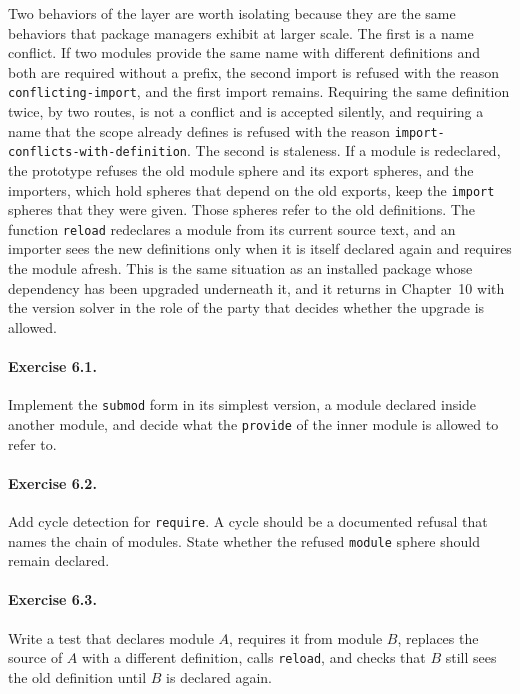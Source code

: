 \documentclass[11pt,oneside]{report}
\theoremstyle{plain}
\theoremstyle{definition}
\theoremstyle{remark}
\begin{document}
Two behaviors of the layer are worth isolating because they are the same behaviors that package managers exhibit at larger scale. The first is a name conflict. If two modules provide the same name with different definitions and both are required without a prefix, the second import is refused with the reason \texttt{conflicting-import}, and the first import remains. Requiring the same definition twice, by two routes, is not a conflict and is accepted silently, and requiring a name that the scope already defines is refused with the reason \texttt{import-conflicts-with-definition}. The second is staleness. If a module is redeclared, the prototype refuses the old module sphere and its export spheres, and the importers, which hold spheres that depend on the old exports, keep the \texttt{import} spheres that they were given. Those spheres refer to the old definitions. The function \texttt{reload} redeclares a module from its current source text, and an importer sees the new definitions only when it is itself declared again and requires the module afresh. This is the same situation as an installed package whose dependency has been upgraded underneath it, and it returns in Chapter~10 with the version solver in the role of the party that decides whether the upgrade is allowed.

\paragraph{Exercise 6.1.} Implement the \texttt{submod} form in its simplest version, a module declared inside another module, and decide what the \texttt{provide} of the inner module is allowed to refer to.

\paragraph{Exercise 6.2.} Add cycle detection for \texttt{require}. A cycle should be a documented refusal that names the chain of modules. State whether the refused \texttt{module} sphere should remain declared.

\paragraph{Exercise 6.3.} Write a test that declares module $A$, requires it from module $B$, replaces the source of $A$ with a different definition, calls \texttt{reload}, and checks that $B$ still sees the old definition until $B$ is declared again.
\end{document}
